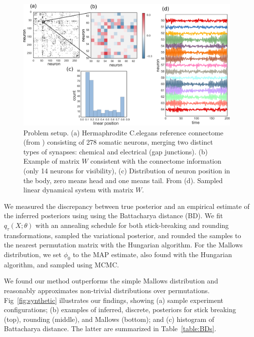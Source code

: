 \documentclass[twoside]{article}
\begin{document}
\begin{figure}[ht]
  \centering
  \includegraphics[width=6in]{../figures/figure6.pdf} 
  \caption{Problem setup. (a) Hermaphrodite C.elegans reference
    connectome (from \cite{varshney2011structural,wormatlas})
    consisting of 278 somatic neurons, merging two distinct types of
    synapses: chemical and electrical (gap junctions). (b) Example of
    matrix $W$ consistent with the connectome information (only 14
    neurons for visibility), (c) Distribution of neuron position in
    the body, zero means head and one means tail. From
    \cite{white1986structure,wormatlas} (d). Sampled linear dynamical system with matrix $W$.}
  \vspace{-1em}
  \label{fig:connectome}
\end{figure}

We measured the discrepancy between true posterior and an empirical
estimate of the inferred posteriors using using the Battacharya
distance (BD). We fit $q_\tau(X; \theta)$ with an annealing schedule
for both stick-breaking and rounding transformations, sampled the
variational posterior, and rounded the samples to the nearest
permutation matrix with the Hungarian algorithm. For the Mallows
distribution, we set $\phi_0$ to the MAP estimate, also found with the
Hungarian algorithm, and sampled using MCMC.
 
We found our method outperforms the simple Mallows distribution and
reasonably approximates non-trivial distributions over
permutations. Fig~\ref{fig:synthetic} illustrates our findings,
showing (a) sample experiment configurations; (b) examples of
inferred, discrete, posteriors for stick breaking (top), rounding
(middle), and Mallows (bottom); and (c) histogram of Battacharya distance.
The latter are summarized in Table~\ref{table:BDs}.
\end{document}
